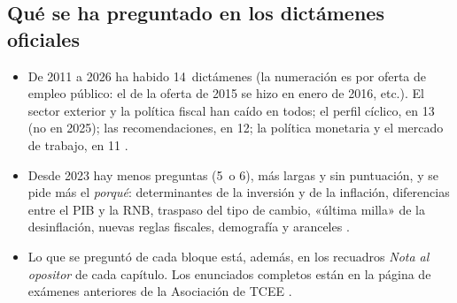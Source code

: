 \documentclass[11pt]{article}
\begin{document}
\subsection{Qué se ha preguntado en los dictámenes oficiales}\label{anexo:preguntas}

\begin{itemize}
\item De 2011 a 2026 ha habido 14~dictámenes (la numeración es por oferta de empleo público: el de la oferta de 2015 se hizo en enero de 2016, etc.). El sector exterior y la política fiscal han caído en todos; el perfil cíclico, en 13 (no en 2025); las recomendaciones, en 12; la política monetaria y el mercado de trabajo, en 11 \parencite{ATCEE2026Examenes}.
\item Desde 2023 hay menos preguntas (5~o 6), más largas y sin puntuación, y se pide más el \emph{porqué}: determinantes de la inversión y de la inflación, diferencias entre el PIB y la RNB, traspaso del tipo de cambio, «última milla» de la desinflación, nuevas reglas fiscales, demografía y aranceles \parencite{ATCEE2026Examenes}.
\item Lo que se preguntó de cada bloque está, además, en los recuadros \emph{Nota al opositor} de cada capítulo. Los enunciados completos están en la página de exámenes anteriores de la Asociación de TCEE \parencite{ATCEE2026Examenes}.
\end{itemize}
\end{document}
